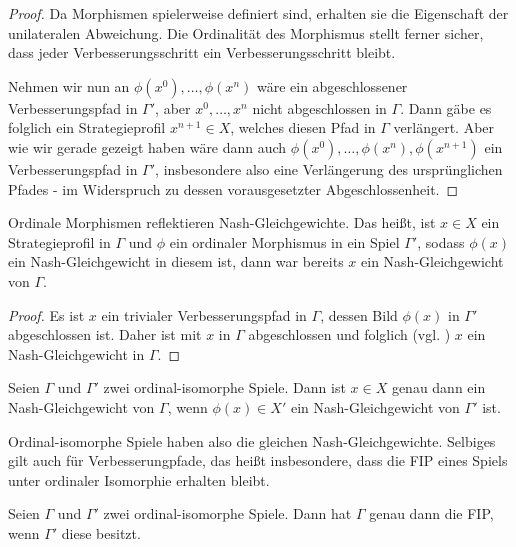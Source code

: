 \begin{proof}
	Da Morphismen spielerweise definiert sind, erhalten sie die Eigenschaft der unilateralen Abweichung. Die Ordinalität des Morphismus stellt ferner sicher, dass jeder Verbesserungsschritt ein Verbesserungsschritt bleibt.
	
	Nehmen wir nun an $\phi(x^0), \dots, \phi(x^n)$ wäre ein abgeschlossener Verbesserungspfad in $\Gamma'$, aber $x^0, \dots, x^n$ nicht abgeschlossen in $\Gamma$. Dann gäbe es folglich ein Strategieprofil $x^{n+1} \in X$, welches diesen Pfad in $\Gamma$ verlängert. Aber wie wir gerade gezeigt haben wäre dann auch $\phi(x^0), \dots, \phi(x^n), \phi(x^{n+1})$ ein Verbesserungspfad in $\Gamma'$, insbesondere also eine Verlängerung des ursprünglichen Pfades - im Widerspruch zu dessen vorausgesetzter Abgeschlossenheit.
\end{proof}

\begin{kor}
	Ordinale Morphismen reflektieren Nash-Gleichgewichte. Das heißt, ist $x \in X$ ein Strategieprofil in $\Gamma$ und $\phi$ ein ordinaler Morphismus in ein Spiel $\Gamma'$, sodass $\phi(x)$ ein Nash-Gleichgewicht in diesem ist, dann war bereits $x$ ein Nash-Gleichgewicht von $\Gamma$.
\end{kor}

\begin{proof}
	Es ist $x$ ein trivialer Verbesserungspfad in $\Gamma$, dessen Bild $\phi(x)$ in $\Gamma'$ abgeschlossen ist. Daher ist mit   $x$ in $\Gamma$ abgeschlossen und folglich (vgl. ) $x$ ein Nash-Gleichgewicht in $\Gamma$.
\end{proof}

\begin{kor}
	Seien $\Gamma$ und $\Gamma'$ zwei ordinal-isomorphe Spiele. Dann ist $x \in X$ genau dann ein Nash-Gleichgewicht von $\Gamma$, wenn $\phi(x) \in X'$ ein Nash-Gleichgewicht von $\Gamma'$ ist.
\end{kor}

Ordinal-isomorphe Spiele haben also die gleichen Nash-Gleichgewichte. Selbiges gilt auch für Verbesserungpfade, das heißt insbesondere, dass die FIP eines Spiels unter ordinaler Isomorphie erhalten bleibt.

\begin{kor}
	Seien $\Gamma$ und $\Gamma'$ zwei ordinal-isomorphe Spiele. Dann hat $\Gamma$ genau dann die FIP, wenn $\Gamma'$ diese besitzt.
\end{kor}


